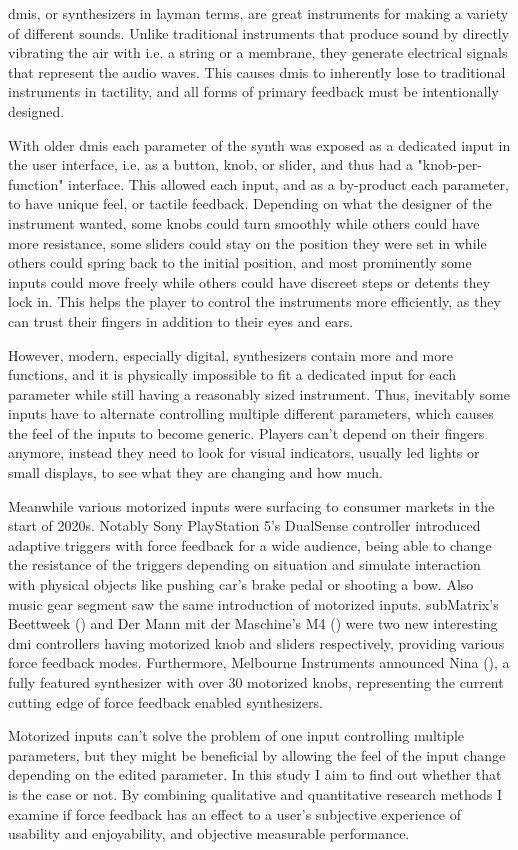 \glspl{dmi}, or synthesizers in layman terms, are great instruments for making a variety of different sounds. Unlike traditional instruments that produce sound by directly vibrating the air with i.e. a string or a membrane, they generate electrical signals that represent the audio waves. This causes \glspl{dmi} to inherently lose to traditional instruments in tactility, and all forms of primary feedback must be intentionally designed.

With older \glspl{dmi} each parameter of the \gls{synth} was exposed as a dedicated input in the user interface, i.e. as a button, knob, or slider, and thus had a "knob-per-function" interface. This allowed each input, and as a by-product each parameter, to have unique feel, or tactile feedback. Depending on what the designer of the instrument wanted, some knobs could turn smoothly while others could have more resistance, some sliders could stay on the position they were set in while others could spring back to the initial position, and most prominently some inputs could move freely while others could have discreet steps or detents they lock in. This helps the player to control the instruments more efficiently, as they can trust their fingers in addition to their eyes and ears.

However, modern, especially digital, synthesizers contain more and more functions, and it is physically impossible to fit a dedicated input for each parameter while still having a reasonably sized instrument. Thus, inevitably some inputs have to alternate controlling multiple different parameters, which causes the feel of the inputs to become generic. Players can't depend on their fingers anymore, instead they need to look for visual indicators, usually led lights or small displays, to see what they are changing and how much.

Meanwhile various motorized inputs were surfacing to consumer markets in the start of 2020s. Notably Sony PlayStation 5's DualSense controller introduced adaptive triggers with force feedback for a wide audience, being able to change the resistance of the triggers depending on situation and simulate interaction with physical objects like pushing car's brake pedal or shooting a bow. Also music gear segment saw the same introduction of motorized inputs. subMatrix's Beettweek (\cite{submatrix2024}) and Der Mann mit der Maschine's M4 (\cite{dmm2024}) were two new interesting \gls{dmi} controllers having motorized knob and sliders respectively, providing various force feedback modes. Furthermore, Melbourne Instruments announced Nina (\cite{melbourneinstruments2024}), a fully featured synthesizer with over 30 motorized knobs, representing the current cutting edge of force feedback enabled synthesizers.

Motorized inputs can't solve the problem of one input controlling multiple parameters, but they might be beneficial by allowing the feel of the input change depending on the edited parameter. In this study I aim to find out whether that is the case or not. By combining qualitative and quantitative research methods I examine if force feedback has an effect to a user's subjective experience of usability and enjoyability, and objective measurable performance.